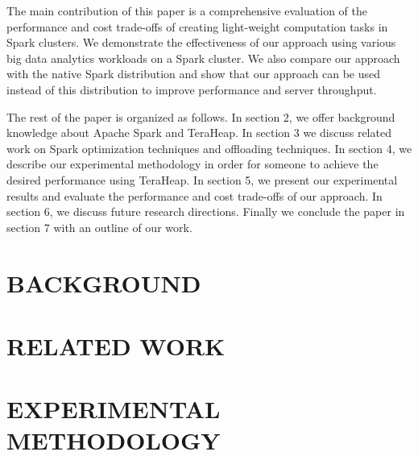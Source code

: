 \documentclass[twocolumn,10pt]{asme2e}
\begin{document}
The main contribution of this paper is a comprehensive evaluation of the performance and cost trade-offs of creating light-weight computation tasks in Spark clusters. We demonstrate the effectiveness of our approach using various big data analytics workloads on a Spark cluster. We also compare our approach with the native Spark distribution and show that our approach can be used instead of this distribution to improve performance and server throughput.

The rest of the paper is organized as follows. In section 2, we offer background knowledge about Apache Spark and TeraHeap. In section 3 we discuss related work on Spark optimization techniques and offloading techniques. In section 4, we describe our experimental methodology in order for someone to achieve the desired performance using TeraHeap. In section 5, we present our experimental results and evaluate the performance and cost trade-offs of our approach. In section 6, we discuss future research directions. Finally we conclude the paper in section 7 with an outline of our work.

\section*{BACKGROUND}

\subsection*{}


\subsubsection*{}

\section*{RELATED WORK}

\section*{EXPERIMENTAL METHODOLOGY}
\end{document}
